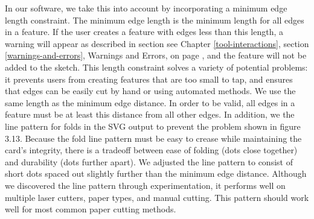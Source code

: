 In our software, we take this into account by incorporating a minimum
edge length constraint. The minimum edge length is the minimum length
for all edges in a feature. If the user creates a feature with edges
less than this length, a warning will appear as described in section see
Chapter \ref{tool-interactions}, section \ref{warnings-and-errors},
Warnings and Errors, on page \pageref{warnings-and-errors}, and the
feature will not be added to the sketch. This length constraint solves a
variety of potential problems: it prevents users from creating features
that are too small to tap, and ensures that edges can be easily cut by
hand or using automated methods. We use the same length as the minimum
edge distance. In order to be valid, all edges in a feature must be at
least this distance from all other edges. In addition, we the line
pattern for folds in the SVG output to prevent the problem shown in
figure 3.13. Because the fold line pattern must be easy to crease while
maintaining the card's integrity, there is a tradeoff between ease of
folding (dots close together) and durability (dots further apart). We
adjusted the line pattern to consist of short dots spaced out slightly
further than the minimum edge distance. Although we discovered the line
pattern through experimentation, it performs well on multiple laser
cutters, paper types, and manual cutting. This pattern should work well
for most common paper cutting methods.
